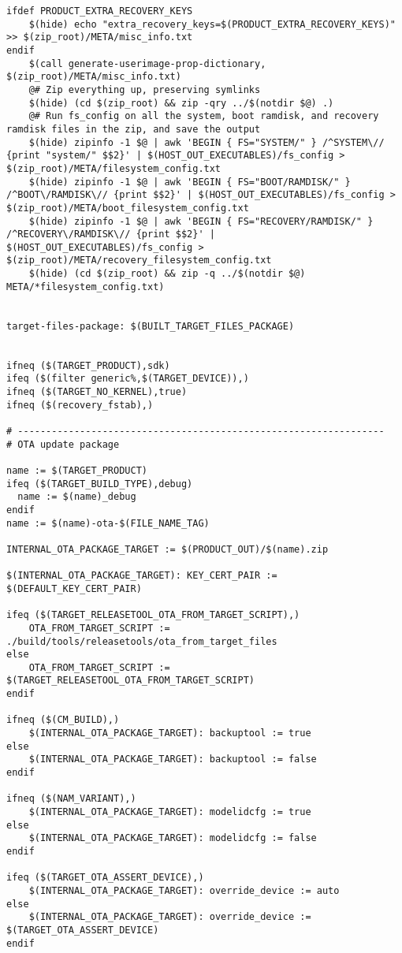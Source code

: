 \documentclass[12pt,a4paper]{article}
\begin{document}
\begin{verbatim}
ifdef PRODUCT_EXTRA_RECOVERY_KEYS
	$(hide) echo "extra_recovery_keys=$(PRODUCT_EXTRA_RECOVERY_KEYS)" >> $(zip_root)/META/misc_info.txt
endif
	$(call generate-userimage-prop-dictionary, $(zip_root)/META/misc_info.txt)
	@# Zip everything up, preserving symlinks
	$(hide) (cd $(zip_root) && zip -qry ../$(notdir $@) .)
	@# Run fs_config on all the system, boot ramdisk, and recovery ramdisk files in the zip, and save the output
	$(hide) zipinfo -1 $@ | awk 'BEGIN { FS="SYSTEM/" } /^SYSTEM\// {print "system/" $$2}' | $(HOST_OUT_EXECUTABLES)/fs_config > $(zip_root)/META/filesystem_config.txt
	$(hide) zipinfo -1 $@ | awk 'BEGIN { FS="BOOT/RAMDISK/" } /^BOOT\/RAMDISK\// {print $$2}' | $(HOST_OUT_EXECUTABLES)/fs_config > $(zip_root)/META/boot_filesystem_config.txt
	$(hide) zipinfo -1 $@ | awk 'BEGIN { FS="RECOVERY/RAMDISK/" } /^RECOVERY\/RAMDISK\// {print $$2}' | $(HOST_OUT_EXECUTABLES)/fs_config > $(zip_root)/META/recovery_filesystem_config.txt
	$(hide) (cd $(zip_root) && zip -q ../$(notdir $@) META/*filesystem_config.txt)


target-files-package: $(BUILT_TARGET_FILES_PACKAGE)


ifneq ($(TARGET_PRODUCT),sdk)
ifeq ($(filter generic%,$(TARGET_DEVICE)),)
ifneq ($(TARGET_NO_KERNEL),true)
ifneq ($(recovery_fstab),)

# -----------------------------------------------------------------
# OTA update package

name := $(TARGET_PRODUCT)
ifeq ($(TARGET_BUILD_TYPE),debug)
  name := $(name)_debug
endif
name := $(name)-ota-$(FILE_NAME_TAG)

INTERNAL_OTA_PACKAGE_TARGET := $(PRODUCT_OUT)/$(name).zip

$(INTERNAL_OTA_PACKAGE_TARGET): KEY_CERT_PAIR := $(DEFAULT_KEY_CERT_PAIR)

ifeq ($(TARGET_RELEASETOOL_OTA_FROM_TARGET_SCRIPT),)
    OTA_FROM_TARGET_SCRIPT := ./build/tools/releasetools/ota_from_target_files
else
    OTA_FROM_TARGET_SCRIPT := $(TARGET_RELEASETOOL_OTA_FROM_TARGET_SCRIPT)
endif

ifneq ($(CM_BUILD),)
    $(INTERNAL_OTA_PACKAGE_TARGET): backuptool := true
else
    $(INTERNAL_OTA_PACKAGE_TARGET): backuptool := false
endif

ifneq ($(NAM_VARIANT),)
    $(INTERNAL_OTA_PACKAGE_TARGET): modelidcfg := true
else
    $(INTERNAL_OTA_PACKAGE_TARGET): modelidcfg := false
endif

ifeq ($(TARGET_OTA_ASSERT_DEVICE),)
    $(INTERNAL_OTA_PACKAGE_TARGET): override_device := auto
else
    $(INTERNAL_OTA_PACKAGE_TARGET): override_device := $(TARGET_OTA_ASSERT_DEVICE)
endif


\end{verbatim}
\end{document}
